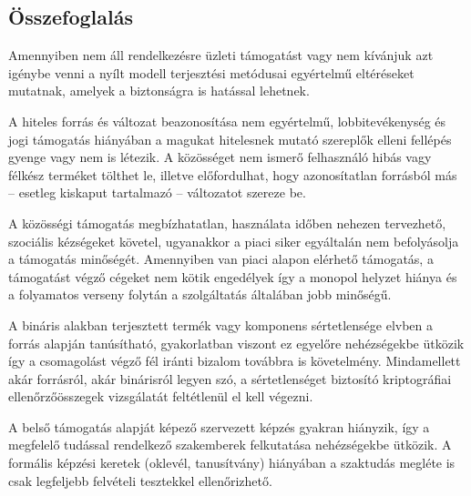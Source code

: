 \documentclass[12pt,magyar,a4paper,oneside]{scrreprt}
\begin{document}
\hypertarget{uxf6sszefoglaluxe1s-7}{%
\subsection{Összefoglalás}\label{uxf6sszefoglaluxe1s-7}}

Amennyiben nem áll rendelkezésre üzleti támogatást vagy nem kívánjuk azt
igénybe venni a nyílt modell terjesztési metódusai egyértelmű
eltéréseket mutatnak, amelyek a biztonságra is hatással lehetnek.

A hiteles forrás és változat beazonosítása nem egyértelmű,
lobbitevékenység és jogi támogatás hiányában a magukat hitelesnek mutató
szereplők elleni fellépés gyenge vagy nem is létezik. A közösséget nem
ismerő felhasználó hibás vagy félkész terméket tölthet le, illetve
előfordulhat, hogy azonosítatlan forrásból más -- esetleg kiskaput
tartalmazó -- változatot szereze be.

A közösségi támogatás megbízhatatlan, használata időben nehezen
tervezhető, szociális kézségeket követel, ugyanakkor a piaci siker
egyáltalán nem befolyásolja a támogatás minőségét. Amennyiben van piaci
alapon elérhető támogatás, a támogatást végző cégeket nem kötik
engedélyek így a monopol helyzet hiánya és a folyamatos verseny folytán
a szolgáltatás általában jobb minőségű.

A bináris alakban terjesztett termék vagy komponens sértetlensége elvben
a forrás alapján tanúsítható, gyakorlatban viszont ez egyelőre
nehézségekbe ütközik így a csomagolást végző fél iránti bizalom továbbra
is követelmény. Mindamellett akár forrásról, akár binárisról legyen szó,
a sértetlenséget biztosító kriptográfiai ellenőrzőösszegek vizsgálatát
feltétlenül el kell végezni.

A belső támogatás alapját képező szervezett képzés gyakran hiányzik, így
a megfelelő tudással rendelkező szakemberek felkutatása nehézségekbe
ütközik. A formális képzési keretek (oklevél, tanusítvány) hiányában a
szaktudás megléte is csak legfeljebb felvételi tesztekkel ellenőrizhető.
\end{document}
